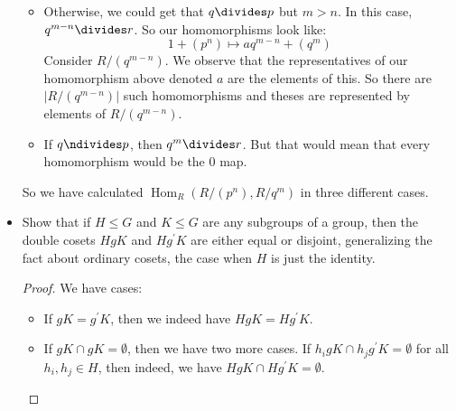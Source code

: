 \documentclass{article}
\begin{document}
\begin{itemize}
\begin{answer}
\begin{itemize}
                        \item Otherwise, we could get that $q \divides p$ but $m > n$. In this case, $q^{m - n} \divides r$. So our homomorphisms look like:
                            \begin{equation*}
                                1 + (p^{n}) \mapsto aq^{m - n} + (q^{m})
                            \end{equation*}
                        Consider $R/(q^{m - n})$. We observe that the representatives of our homomorphism above denoted $a$ are the elements of this. So there are $\lvert R/(q^{m - n}) \rvert$ such homomorphisms and theses are represented by elements of $R/(q^{m - n})$.

                        \item If $q \ndivides p$, then $q^{m} \divides r$. But that would mean that every homomorphism would be the $0$ map.
                    \end{itemize}
                So we have calculated $\mathop{Hom}_{R}(R/(p^{n}), R/q^{m})$ in three different cases.
            \end{answer}

        \item Show that if $H \leq G$ and $K \leq G$ are any subgroups of a group, then the double cosets $HgK$ and $Hg^{\prime}K$ are either equal or disjoint, generalizing the fact about ordinary cosets, the case when $H$ is just the identity. 
            \begin{proof}
                We have cases:
                    \begin{itemize}
                        \item If $gK = g^{\prime}K$, then we indeed have $HgK = Hg^{\prime}K$.

                        \item If $gK \cap gK = \emptyset$, then we have two more cases. If $h_{i}gK \cap h_{j}g^{\prime}K = \emptyset$ for all $h_{i}, h_{j} \in H$, then indeed, we have $HgK \cap Hg^{\prime}K = \emptyset$. 


\end{itemize}
\end{proof}
\end{itemize}
\end{document}
